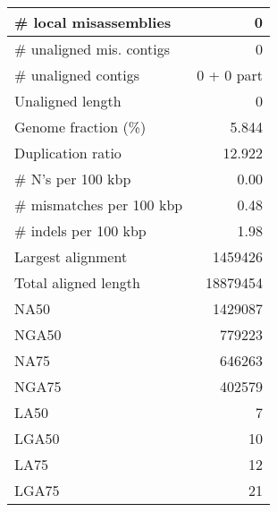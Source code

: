 \documentclass[12pt,a4paper]{article}
\begin{document}
\begin{table}[ht]
\begin{center}
\begin{tabular}{|l*{1}{|r}|}
\# local misassemblies & 0 \\ \hline
\# unaligned mis. contigs & 0 \\ \hline
\# unaligned contigs & 0 + 0 part \\ \hline
Unaligned length & 0 \\ \hline
Genome fraction (\%) & 5.844 \\ \hline
Duplication ratio & 12.922 \\ \hline
\# N's per 100 kbp & 0.00 \\ \hline
\# mismatches per 100 kbp & 0.48 \\ \hline
\# indels per 100 kbp & 1.98 \\ \hline
Largest alignment & 1459426 \\ \hline
Total aligned length & 18879454 \\ \hline
NA50 & 1429087 \\ \hline
NGA50 & 779223 \\ \hline
NA75 & 646263 \\ \hline
NGA75 & 402579 \\ \hline
LA50 & 7 \\ \hline
LGA50 & 10 \\ \hline
LA75 & 12 \\ \hline
LGA75 & 21 \\ \hline
\end{tabular}
\end{center}
\end{table}
\end{document}
